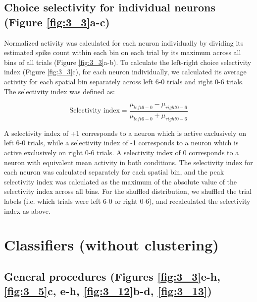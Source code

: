 \subsection[Choice selectivity for individual neurons]{Choice selectivity for individual neurons (Figure \ref{fig:3_3}a-c)} \label{methods:choice_sel}
Normalized activity was calculated for each neuron individually by dividing its estimated spike count within each bin on each trial by its maximum across all bins of all trials (Figure \ref{fig:3_3}a-b). To calculate the left-right choice selectivity index (Figure \ref{fig:3_3}c), for each neuron individually, we calculated its average activity for each spatial bin separately across left 6-0 trials and right 0-6 trials. The selectivity index was defined as:

\vspace*{-30pt}

\begin{equation*}
\textrm{Selectivity index} = \frac{\mu_{left 6-0} - \mu_{right 0-6}}{\mu_{left 6-0} + \mu_{right 0-6}}
\end{equation*}

A selectivity index of +1 corresponds to a neuron which is active exclusively on left 6-0 trials, while a selectivity index of -1 corresponds to a neuron which is active exclusively on right 0-6 trials. A selectivity index of 0 corresponds to a neuron with equivalent mean activity in both conditions. The selectivity index for each neuron was calculated separately for each spatial bin, and the peak selectivity index was calculated as the maximum of the absolute value of the selectivity index across all bins. For the shuffled distribution, we shuffled the trial labels (i.e. which trials were left 6-0 or right 0-6), and recalculated the selectivity index as above. 

\section{Classifiers (without clustering)} \label{methods:class_no_cluster}

\subsection[General procedures]{General procedures (Figures \ref{fig:3_3}e-h, \ref{fig:3_5}c, e-h, \ref{fig:3_12}b-d, \ref{fig:3_13})} \label{methods:class_no_cluster_general}

